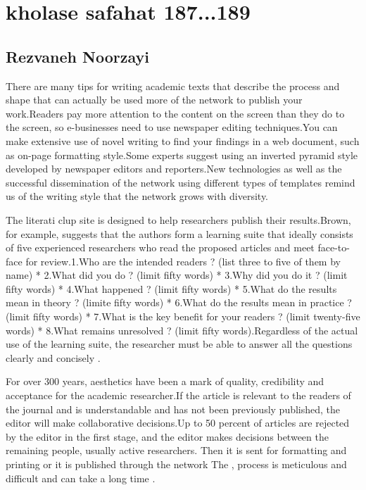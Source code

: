 \documentclass [12pt]{beamer}
\begin{document}
\section*{kholase safahat 187...189}
\subsection*{Rezvaneh Noorzayi }	
\begin{frame}
\justifying	
There are many tips for writing academic texts that describe the process and shape that can actually be used more of the network to publish your work.Readers pay more attention to the content on the screen than they do to the screen, so e-businesses need to use newspaper editing techniques.You can make extensive use of novel writing to find your findings in a web document, such as on-page formatting style.Some experts suggest using an inverted pyramid style developed by newspaper editors and reporters.New technologies as well as the successful dissemination of the network using different types of templates remind us of the writing style that the network grows with diversity.
\end{frame}

\begin{frame}
\justifying	
The literati clup site is designed to help researchers publish their results.Brown, for example, suggests that the authors form a learning suite that ideally consists of five experienced researchers who read the proposed articles and meet face-to-face for review.1.Who are the intended readers ? (list three to five of them by name) *  2.What did you do ? (limit fifty words) * 3.Why did you do it ? (limit fifty words) * 4.What happened ? (limit fifty words) * 5.What do the results mean in theory ? (limite fifty words) * 6.What do the results mean in practice ? (limit fifty words) * 7.What is the key benefit for your readers ? (limit twenty-five words) * 8.What remains unresolved ? (limit fifty words).Regardless of the actual use of the learning suite, the researcher must be able to answer all the questions clearly and concisely .
\end{frame}

\begin{frame}
\justifying

For over 300 years, aesthetics have been a mark of quality, credibility and acceptance for the academic researcher.If the article is relevant to the readers of the journal and is understandable and has not been previously published, the editor will make 
collaborative decisions.Up to 50 percent  of articles are rejected by the editor in the first stage, and the editor makes decisions between the remaining people, usually active researchers. Then it is sent for formatting and printing or it is published through the network  The , process is meticulous  and difficult and can take a long time .  

\end{frame}
\end{document}
